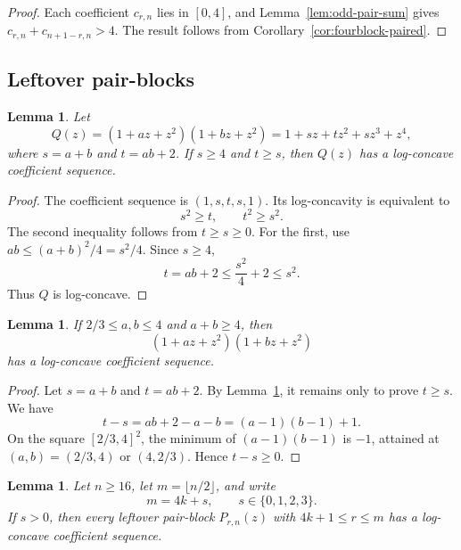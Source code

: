 \documentclass[11pt]{amsart}
\newtheorem{lemma}[theorem]{Lemma}
\begin{document}
\begin{proof}
Each coefficient \(c_{r,n}\) lies in \([0,4]\), and Lemma~\ref{lem:odd-pair-sum} gives \(c_{r,n}+c_{n+1-r,n}>4\).  The result follows from Corollary~\ref{cor:fourblock-paired}.
\end{proof}

\subsection{Leftover pair-blocks}

\begin{lemma}\label{lem:quartic-criterion}
Let
\[
        Q(z)=(1+az+z^2)(1+bz+z^2)
        =1+sz+tz^2+sz^3+z^4,
\]
where \(s=a+b\) and \(t=ab+2\).  If \(s\ge4\) and \(t\ge s\), then \(Q(z)\) has a log-concave coefficient sequence.
\end{lemma}

\begin{proof}
The coefficient sequence is \((1,s,t,s,1)\).  Its log-concavity is equivalent to
\[
        s^2\ge t,
        \qquad
        t^2\ge s^2.
\]
The second inequality follows from \(t\ge s\ge0\).  For the first, use \(ab\le(a+b)^2/4=s^2/4\).  Since \(s\ge4\),
\[
        t=ab+2\le\frac{s^2}{4}+2\le s^2.
\]
Thus \(Q\) is log-concave.
\end{proof}

\begin{lemma}\label{lem:two-thirds}
If \(2/3\le a,b\le4\) and \(a+b\ge4\), then
\[
        (1+az+z^2)(1+bz+z^2)
\]
has a log-concave coefficient sequence.
\end{lemma}

\begin{proof}
Let \(s=a+b\) and \(t=ab+2\).  By Lemma~\ref{lem:quartic-criterion}, it remains only to prove \(t\ge s\).  We have
\[
        t-s=ab+2-a-b=(a-1)(b-1)+1.
\]
On the square \([2/3,4]^2\), the minimum of \((a-1)(b-1)\) is \(-1\), attained at \((a,b)=(2/3,4)\) or \((4,2/3)\).  Hence \(t-s\ge0\).
\end{proof}

\begin{lemma}\label{lem:odd-tail-pairs}
Let \(n\ge16\), let \(m=\lfloor n/2\rfloor\), and write
\[
        m=4k+s,
        \qquad s\in\{0,1,2,3\}.
\]
If \(s>0\), then every leftover pair-block \(P_{r,n}(z)\) with \(4k+1\le r\le m\) has a log-concave coefficient sequence.
\end{lemma}
\end{document}
